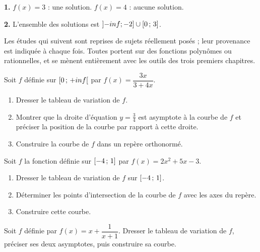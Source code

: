 \begin{corrige}
\textbf{1.} $f(x)=3$ : une solution. $f(x)=4$ : aucune solution.

\textbf{2.} L'ensemble des solutions est
$\left]-inf ; -2\right] \cup \left[0\,;\,3\right]$.
\end{corrige}

\begin{annales}
Les études qui suivent sont reprises de sujets réellement posés ; leur
provenance est indiquée à chaque fois. Toutes portent sur des fonctions
polynômes ou rationnelles, et se mènent entièrement avec les outils des trois
premiers chapitres.

Soit $f$ définie sur $\left[0\,;\,+inf\right[$ par
$f(x) = \dfrac{3x}{3+4x}$.
\begin{enumerate}[label=\textbf{\alph*)}, leftmargin=*, itemsep=0.15em]
  \item Dresser le tableau de variation de $f$.
  \item Montrer que la droite d'équation $y = \frac34$ est asymptote à la
        courbe de $f$ et préciser la position de la courbe par rapport à
        cette droite.
  \item Construire la courbe de $f$ dans un repère orthonormé.
\end{enumerate}

Soit $f$ la fonction définie sur $\left[-4\,;\,1\right]$ par
$f(x) = 2x^{2}+5x-3$.
\begin{enumerate}[label=\textbf{\alph*)}, leftmargin=*, itemsep=0.15em]
  \item Dresser le tableau de variation de $f$ sur $\left[-4\,;\,1\right]$.
  \item Déterminer les points d'intersection de la courbe de $f$ avec les axes
        du repère.
  \item Construire cette courbe.
\end{enumerate}

Soit $f$ définie par $f(x) = x+\dfrac{1}{x+1}$. Dresser le tableau de variation
de $f$, préciser ses deux asymptotes, puis construire sa courbe.


\end{annales}

